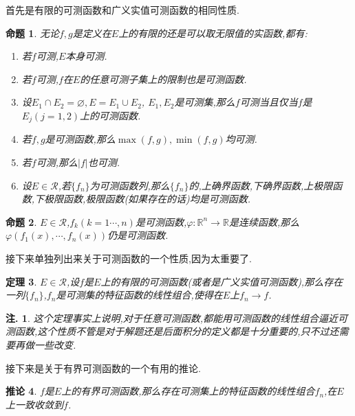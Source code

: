 \documentclass[12pt,a4paper,oneside]{ctexart}
\theoremstyle{nonumberplain}
\theoremstyle{plain}
\newtheorem{theorem}{定理}[section]
\theoremstyle{plain}
\theoremstyle{nonumberplain}
\newtheorem{remark}{注.}
\theoremstyle{plain}
\theoremstyle{plain}
\theoremstyle{plain}
\newtheorem{proposition}[theorem]{命题}
\theoremstyle{plain}
\newtheorem{corollary}[theorem]{推论}
\newcommand{\R}{\mathbb{R}}
\renewcommand{\phi}{\varphi}
\newcommand{\cR}{\mathcal{R}}
\begin{document}
    首先是有限的可测函数和广义实值可测函数的相同性质.
    \begin{proposition}
        无论$f,g$是定义在$E$上的有限的还是可以取无限值的实函数,都有:
        \begin{enumerate}
            \item 若$f$可测,$E$本身可测.
            \item 若$f$可测,$f$在$E$的任意可测子集上的限制也是可测函数.
            \item 设$E_1\cap E_2=\varnothing,E=E_1\cup E_2$, $E_1,E_2$是可测集,那么$f$可测当且仅当$f$是$E_j(j=1,2)$上的可测函数.
            \item 若$f,g$是可测函数,那么$\max(f,g),\min(f,g)$均可测.
            \item 若$f$可测,那么$|f|$也可测.
            \item 设$E\in\cR$,若$\{f_n\}$为可测函数列,那么$\{f_n\}$的,上确界函数,下确界函数,上极限函数,下极限函数,极限函数(如果存在的话)均是可测函数.
        \end{enumerate}
    \end{proposition}
    \begin{proposition}
        $E\in\cR$,$f_k(k=1\cdots,n)$是可测函数,$\phi:\R^n\longrightarrow \R$是连续函数,那么\\$\phi(f_1(x),\cdots,f_n(x))$仍是可测函数.
    \end{proposition}
    接下来单独列出来关于可测函数的一个性质,因为太重要了.
    \begin{theorem}
        $E\in\cR$,设$f$是$E$上的有限的可测函数(或者是广义实值可测函数),那么存在一列$\{f_n\}$,$f_n$是可测集的特征函数的线性组合,使得在$E$上$f_n\to f$.
    \end{theorem}
    \begin{remark}
        这个定理事实上说明,对于任意可测函数,都能用可测函数的线性组合逼近可测函数,这个性质不管是对于解题还是后面积分的定义都是十分重要的,只不过还需要再做一些改变.
    \end{remark}
    接下来是关于有界可测函数的一个有用的推论.
    \begin{corollary}
        $f$是$E$上的有界可测函数,那么存在可测集上的特征函数的线性组合$f_n$,在$E$上一致收敛到$f$.
    \end{corollary}
\end{document}

